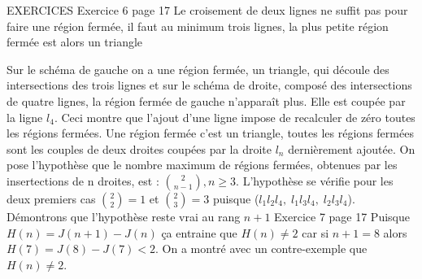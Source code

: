 \documentclass{amsart}
\begin{document}
EXERCICES\newline\newline
Exercice 6 page 17\newline
Le croisement de deux lignes ne suffit pas pour faire une région fermée, il faut au minimum trois lignes, la plus petite région fermée est alors un triangle \newline
{}\newline
Sur le schéma de gauche on a une région fermée, un triangle, qui découle des intersections des trois lignes et sur le schéma de droite, composé des intersections de quatre lignes, la région fermée de gauche n'apparaît plus. Elle est coupée par la ligne $l_4$. Ceci montre que l'ajout d'une ligne impose de recalculer de zéro toutes les régions fermées. \newline
Une région fermée c'est un triangle, toutes les régions fermées sont les couples de deux droites coupées par la droite $l_n$ dernièrement ajoutée. \newline\newline
On pose l'hypothèse que le nombre maximum de régions fermées, obtenues  par les insertections de n droites, est :  $\binom{2}{n-1},  n\geq3$. \newline\newline
L'hypothèse se vérifie pour les deux premiers cas $\binom{2}{2} = 1$ et $\binom{2}{3} = 3$ puisque ($l_1l_2l_4,\; l_1l_3l_4,\; l_2l_3l_4$). Démontrons que l'hypothèse reste vrai au rang $n+1$
 \newline\newline
Exercice 7 page 17 \newline
Puisque $H(n) = J(n+1) - J(n)$ ça entraine que $H(n) \neq 2$ car si $n+1 = 8$ alors $H(7) = J(8) - J(7) < 2$.\newline
On a montré avec un contre-exemple que  $H(n) \neq 2$.
\end{document}
